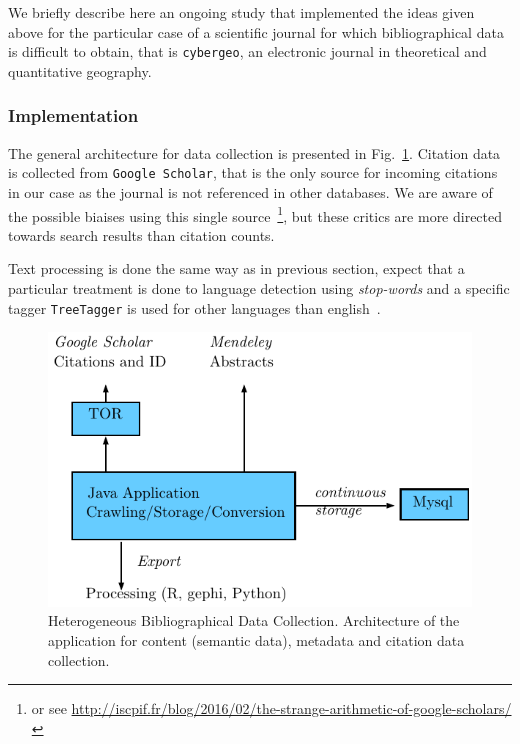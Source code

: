 We briefly describe here an ongoing study that implemented the ideas given above for the particular case of a scientific journal for which bibliographical data is difficult to obtain, that is \texttt{cybergeo}, an electronic journal in theoretical and quantitative geography.


\cite{2015arXiv151003797G}
\cite{2016arXiv160208451P}
\cite{choi2014patent}
\cite{shibata2008detecting}


\subsubsection{Implementation}

The general architecture for data collection is presented in Fig.~\ref{fig:quantepistemo:data}. Citation data is collected from \texttt{Google Scholar}, that is the only source for incoming citations~\cite{noruzi2005google} in our case as the journal is not referenced in other databases. We are aware of the possible biaises using this single source~\cite{bohannon2014scientific}\footnote{or see \url{http://iscpif.fr/blog/2016/02/the-strange-arithmetic-of-google-scholars/}}, but these critics are more directed towards search results than citation counts. 



Text processing is done the same way as in previous section, expect that a particular treatment is done to language detection using \emph{stop-words} and a specific tagger \texttt{TreeTagger} is used for other languages than english~\cite{schmid1994probabilistic}.





\begin{figure}
\includegraphics[width=\textwidth]{Figures/PartI/QuantitativeEpistemo/HyperNetwork/archi}
\caption[Heterogeneous Bibliographical Data Collection]{Heterogeneous Bibliographical Data Collection. Architecture of the application for content (semantic data), metadata and citation data collection.}
\label{fig:quantepistemo:data}
\end{figure}


